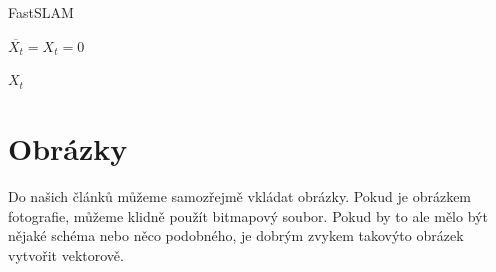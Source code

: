 \documentclass[a4paper,11pt]{article}
\begin{document}
\IncMargin{1.5em}
\begin{algorithm}
\caption{FastSLAM}
\SetAlgoNoLine
\SetAlgoLongEnd
\SetNlSty{}{}{:}
\label{alg}
\Indm\Indmm
\BlankLine
	\Indp\Indpp
		$\overline{X_t}=X_t=0$

		\KwRet${X_t}$
\end{algorithm}
\DecMargin{1.5em}

\section{Obrázky}
\noindent Do našich článků můžeme samozřejmě vkládat obrázky. Pokud je obrázkem fotografie, můžeme klidně použít bitmapový soubor. Pokud by to ale mělo být nějaké schéma nebo něco podobného, je dobrým zvykem takovýto obrázek vytvořit vektorově.
\end{document}
